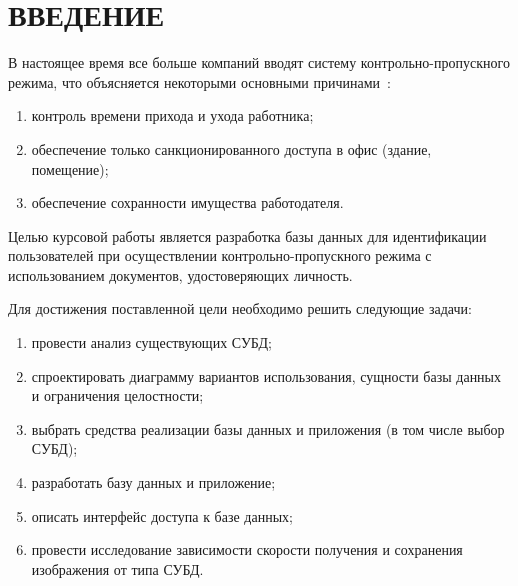 \chapter*{ВВЕДЕНИЕ}

В настоящее время все больше компаний вводят систему контрольно-пропускного режима, что объясняется некоторыми основными причинами~\cite{introCPP}:
\begin{enumerate}
	\item контроль времени прихода и ухода работника;
	\item обеспечение только санкционированного доступа в офис (здание, помещение);
	\item обеспечение сохранности имущества работодателя.
\end{enumerate}

Целью курсовой работы является разработка базы данных для идентификации пользователей при осуществлении контрольно-пропускного режима с использованием документов, удостоверяющих личность.

Для достижения поставленной цели необходимо решить следующие задачи:
\begin{enumerate}
	\item провести анализ существующих СУБД;
	\item спроектировать диаграмму вариантов использования, сущности базы данных и ограничения целостности;
	\item выбрать средства реализации базы данных и приложения (в том числе выбор СУБД);
	\item разработать базу данных и приложение;
	\item описать интерфейс доступа к базе данных;
	\item провести исследование зависимости скорости получения и сохранения изображения от типа СУБД.
\end{enumerate}
